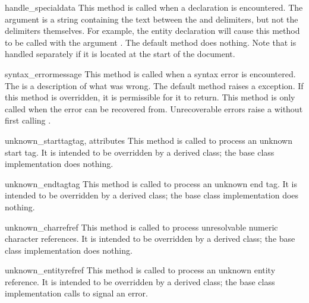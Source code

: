 \begin{methoddesc}{handle_special}{data}
This method is called when a declaration is encountered.  The
 argument is a string containing the text between the
\samp{<!} and \samp{>} delimiters, but not the delimiters
themselves.  For example, the entity
declaration  will cause this method to be called
with the argument .  The default method does
nothing.  Note that  is handled separately if it
is located at the start of the document.
\end{methoddesc}

\begin{methoddesc}{syntax_error}{message}
This method is called when a syntax error is encountered.  The
 is a description of what was wrong.  The default method 
raises a  exception.  If this method is
overridden, it is permissible for it to return.  This method is only
called when the error can be recovered from.  Unrecoverable errors
raise a  without first calling
.
\end{methoddesc}

\begin{methoddesc}{unknown_starttag}{tag, attributes}
This method is called to process an unknown start tag.  It is intended
to be overridden by a derived class; the base class implementation
does nothing.
\end{methoddesc}

\begin{methoddesc}{unknown_endtag}{tag}
This method is called to process an unknown end tag.  It is intended
to be overridden by a derived class; the base class implementation
does nothing.
\end{methoddesc}

\begin{methoddesc}{unknown_charref}{ref}
This method is called to process unresolvable numeric character
references.  It is intended to be overridden by a derived class; the
base class implementation does nothing.
\end{methoddesc}

\begin{methoddesc}{unknown_entityref}{ref}
This method is called to process an unknown entity reference.  It is
intended to be overridden by a derived class; the base class
implementation calls  to signal an error.
\end{methoddesc}


